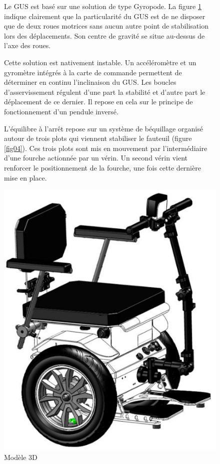 \begin{figure}[ht!]
\begin{minipage}{0.6\linewidth}
Le GUS est basé sur une solution de type Gyropode. La figure \ref{fig03} indique clairement que la particularité du GUS est de ne disposer que de deux roues motrices sans aucun autre point de stabilisation lors des déplacements. Son centre de gravité se situe au-dessus de l'axe des roues.

Cette solution est nativement instable. Un accéléromètre et un gyromètre intégrés à la carte de commande permettent de déterminer en continu l'inclinaison du GUS. Les boucles d'asservissement régulent d'une part la stabilité et d'autre part le déplacement de ce dernier. Il repose en cela sur le principe de fonctionnement d'un pendule inversé.

L'équilibre à l'arrêt repose sur un système de béquillage organisé autour de trois plots qui viennent stabiliser le fauteuil (figure \ref{fig04}). Ces trois plots sont mis en mouvement par l'intermédiaire d'une fourche actionnée par un vérin. Un second vérin vient renforcer le positionnement de la fourche, une fois cette dernière mise en place.
\end{minipage}
\hfill
\begin{minipage}{0.35\linewidth}
\centering\includegraphics[width=0.8\linewidth]{img/fig03}
\caption{\label{fig03}Modèle 3D}
\end{minipage}
\end{figure}



